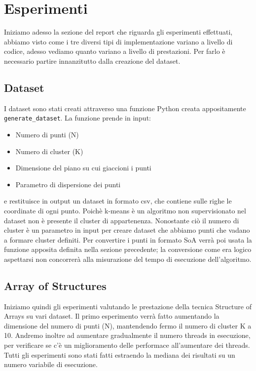 \documentclass[10pt,twocolumn,letterpaper]{article}
\begin{document}

\section{Esperimenti}
Iniziamo adesso la sezione del report che riguarda gli
esperimenti effettuati, abbiamo visto come i tre diversi tipi
di implementazione variano a livello di codice, adesso vediamo quanto variano a livello di prestazioni. Per farlo è necessario partire innanzitutto dalla creazione del dataset.

\subsection{Dataset}
I dataset sono stati creati attraverso una funzione Python creata appositamente \lstinline{generate_dataset}. La funzione prende in input:
\begin{itemize}
   \item Numero di punti (N)
   \item Numero di cluster (K)
   \item Dimensione del piano su cui giaccioni i punti
   \item Parametro di dispersione dei punti
\end{itemize}
e restituisce in output un dataset in formato csv, che contiene sulle righe le coordinate di ogni punto. Poichè k-means è un algoritmo non supervisionato nel dataset non è presente il cluster di appartenenza. Nonostante ciò il numero di cluster è un parametro in input per creare dataset che abbiamo punti che vadano a formare cluster definiti. Per convertire i punti in formato SoA verrà poi usata la funzione apposita definita nella sezione precedente; la conversione come era logico aspettarsi non concorrerà alla misurazione del tempo di esecuzione dell'algoritmo.


\subsection{Array of Structures}
Iniziamo quindi gli esperimenti valutando le prestazione della tecnica Structure of Arrays su vari dataset. Il primo esperimento verrà fatto aumentando la dimensione del numero di punti (N), mantendendo fermo il numero di cluster K a 10. Andremo inoltre ad aumentare gradualmente il numero threads in esecuzione, per verificare se c'è un miglioramento delle performace all'aumentare dei threads. Tutti gli esperimenti sono stati fatti estraendo la mediana dei risultati su un numero variabile di esecuzione.
\end{document}

